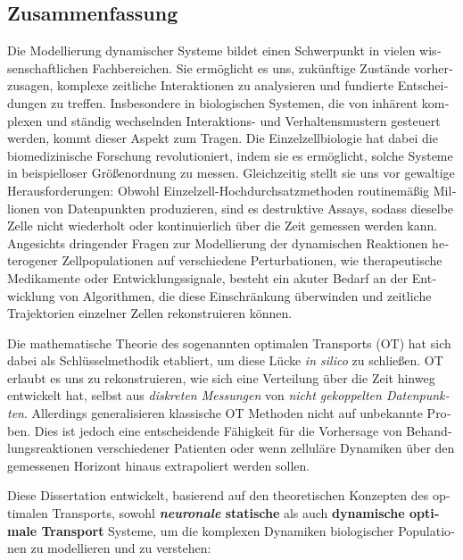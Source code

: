 \begin{otherlanguage}{ngerman}
\chapter*{Zusammenfassung}

Die Modellierung dynamischer Systeme bildet einen Schwerpunkt in vielen wissenschaftlichen Fachbereichen. Sie erm{\"o}glicht es uns, zuk{\"u}nftige Zust{\"a}nde vorherzusagen, komplexe zeitliche Interaktionen zu analysieren und fundierte Entscheidungen zu treffen. Insbesondere in biologischen Systemen, die von inh{\"a}rent komplexen und st{\"a}ndig wechselnden Interaktions- und Verhaltensmustern gesteuert werden, kommt dieser Aspekt zum Tragen.
Die Einzelzellbiologie hat dabei die biomedizinische Forschung revolutioniert, indem sie es erm{\"o}glicht, solche Systeme in beispielloser Gr{\"o}{\ss}enordnung zu messen. Gleichzeitig stellt sie uns vor gewaltige Herausforderungen: Obwohl Einzelzell-Hochdurchsatzmethoden routinem{\"a}{\ss}ig Millionen von Datenpunkten produzieren, sind es destruktive Assays, sodass dieselbe Zelle nicht wiederholt oder kontinuierlich {\"u}ber die Zeit gemessen werden kann.
Angesichts dringender Fragen zur Modellierung der dynamischen Reaktionen heterogener Zellpopulationen auf verschiedene Perturbationen, wie therapeutische Medikamente oder Entwicklungssignale, besteht ein akuter Bedarf an der Entwicklung von Algorithmen, die diese Einschr{\"a}nkung {\"u}berwinden und zeitliche Trajektorien einzelner Zellen rekonstruieren k{\"o}nnen.

Die mathematische Theorie des sogenannten optimalen Transports (OT) hat sich dabei als Schl{\"u}sselmethodik etabliert, um diese L{\"u}cke \emph{in silico} zu schlie{\ss}en. OT erlaubt es uns zu rekonstruieren, wie sich eine Verteilung {\"u}ber die Zeit hinweg entwickelt hat, selbst aus \textit{diskreten Messungen} von \textit{nicht gekoppelten Datenpunkten}. Allerdings generalisieren klassische OT Methoden nicht auf unbekannte Proben. Dies ist jedoch eine entscheidende F{\"a}higkeit f{\"u}r die Vorhersage von Behandlungsreaktionen verschiedener Patienten oder wenn zellul{\"a}re Dynamiken {\"u}ber den gemessenen Horizont hinaus extrapoliert werden sollen.

Diese Dissertation entwickelt, basierend auf den theoretischen Konzepten des optimalen Transports, sowohl \textbf{\textit{neuronale} statische} als auch \textbf{dynamische optimale Transport} Systeme, um die komplexen Dynamiken biologischer Populationen zu modellieren und zu verstehen:


\end{otherlanguage}
